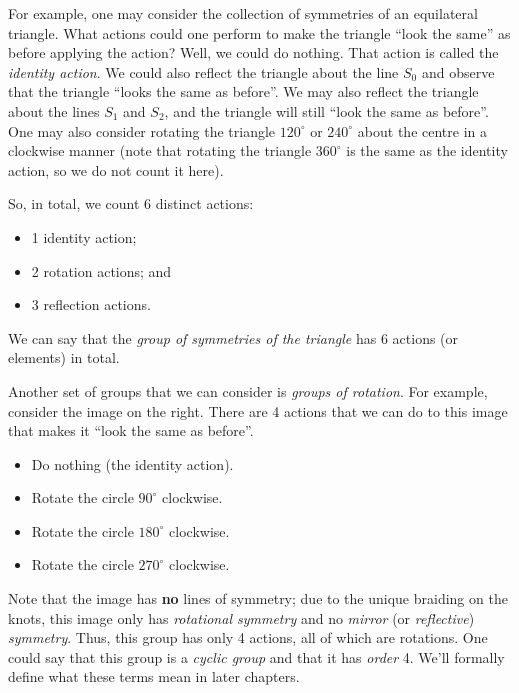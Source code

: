 For example, one may consider the collection of symmetries of an equilateral triangle. What actions could one perform to make the triangle ``look the same'' as before applying the action? Well, we could do nothing. That action is called the \textit{identity action}. We could also reflect the triangle about the line $S_0$ and observe that the triangle ``looks the same as before''. We may also reflect the triangle about the lines $S_1$ and $S_2$, and the triangle will still ``look the same as before''. One may also consider rotating the triangle $120^\circ$ or $240^\circ$ about the centre in a clockwise manner (note that rotating the triangle $360^\circ$ is the same as the identity action, so we do not count it here).

\newpage

So, in total, we count 6 distinct actions:
\begin{itemize}
    \item 1 identity action;
    \item 2 rotation actions; and
    \item 3 reflection actions.
\end{itemize}
We can say that the \textit{group of symmetries of the triangle} has 6 actions (or elements) in total.

\begin{figure}
    \centering
\end{figure}

Another set of groups that we can consider is \textit{groups of rotation}. For example, consider the image on the right. There are 4 actions that we can do to this image that makes it ``look the same as before''.
\begin{itemize}
    \item Do nothing (the identity action).
    \item Rotate the circle $90^\circ$ clockwise.
    \item Rotate the circle $180^\circ$ clockwise.
    \item Rotate the circle $270^\circ$ clockwise.
\end{itemize}
Note that the image has \textbf{no} lines of symmetry; due to the unique braiding on the knots, this image only has \textit{rotational symmetry} and no \textit{mirror} (or \textit{reflective}) \textit{symmetry}. Thus, this group has only 4 actions, all of which are rotations. One could say that this group is a \textit{cyclic group} and that it has \textit{order} 4. We'll formally define what these terms mean in later chapters.


